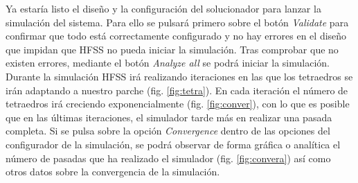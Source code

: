 \par Ya estaría listo el diseño y la configuración del solucionador para lanzar la simulación del sistema. Para ello se pulsará primero sobre el botón \textit{Validate} para confirmar que todo está correctamente configurado y no hay errores en el diseño que impidan que HFSS no pueda iniciar la simulación. Tras comprobar que no existen errores, mediante el botón \textit{Analyze all} se podrá iniciar la simulación. Durante la simulación HFSS irá realizando iteraciones en las que los tetraedros se irán adaptando a nuestro parche (fig. \ref{fig:tetra}). En cada iteración el número de tetraedros irá creciendo exponencialmente (fig. \ref{fig:conver}), con lo que es posible que en las últimas iteraciones, el simulador tarde más en realizar una pasada completa. Si se pulsa sobre la opción \textit{Convergence} dentro de las opciones del configurador de la simulación, se podrá observar de forma gráfica o analítica el número de pasadas que ha realizado el simulador (fig. \ref{fig:convera}) así como otros datos sobre la convergencia de la simulación.
\\

